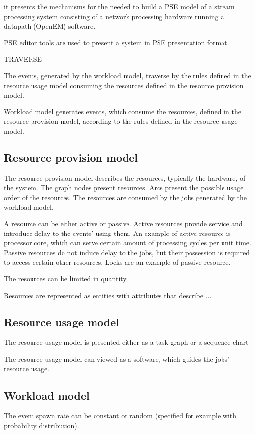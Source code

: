  it presents the mechanisms for the needed to build a PSE model of a stream processing system consisting of a network processing hardware running a datapath (OpenEM) software.


PSE editor tools are used to present a system in PSE presentation format.

TRAVERSE

The events, generated by the workload model, traverse by the rules defined in the resource usage model consuming the resources defined in the resource provision model.

Workload model generates events, which consume the resources, defined in the resource provision model, according to the rules defined in the resource usage model.


\subsection{Resource provision model}
The resource provision model describes the resources, typically the hardware, of the system. The graph nodes present resources. Arcs present the possible usage order of the resources. The resources are consumed by the jobs  generated by the workload model.

A resource can be either active or passive. Active resources provide service and introduce delay to the events' using them. An example of active resource is processor core, which can serve certain amount of processing cycles per unit time. Passive resources do not induce delay to the jobs, but their possession is required to access certain other resources. Locks are an example of passive resource.

The resources can be limited in quantity.

Resources are represented as entities with attributes that describe ...

\subsection{Resource usage model}

The resource usage model is presented either as a task graph or a sequence chart

The resource usage model can viewed as a software, which guides the jobs' resource usage.

\subsection{Workload model}
The event spawn rate can be constant or random (specified for example with probability distribution).

